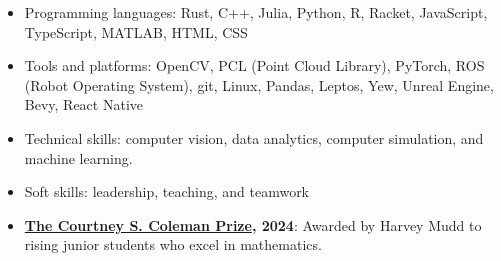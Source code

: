 \documentclass[9pt]{resume}
\begin{document}
    \vspace{-0.2cm}
    \begin{itemize}[noitemsep, topsep=0pt]
        \item Programming languages: Rust, C++, Julia, Python, R, Racket, JavaScript, TypeScript, MATLAB, HTML, CSS
        \item Tools and platforms: OpenCV, PCL (Point Cloud Library), PyTorch, ROS (Robot Operating System), git, Linux, Pandas, Leptos, Yew, Unreal Engine, Bevy, React Native
        \item Technical skills: computer vision, data analytics, computer simulation, and machine learning.
        \item Soft skills: leadership, teaching, and teamwork
    \end{itemize}
    \vspace{0.2cm}
    \begin{itemize}[noitemsep, topsep=0pt]
        \item \href{https://www.hmc.edu/mathematics/about/awards/#heading-accordion-item-sophomore}{\textbf{The Courtney S. Coleman Prize}}\textbf{, 2024}: Awarded by Harvey Mudd to rising junior students who excel in mathematics.
    \end{itemize}
        
        

\end{document}
